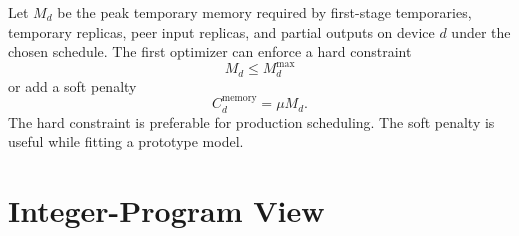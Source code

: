 \documentclass[11pt]{article}
\begin{document}
Let $M_d$ be the peak temporary memory required by first-stage temporaries,
temporary replicas, peer input replicas, and partial outputs on device $d$
under the chosen schedule.  The first optimizer can enforce a hard constraint
\begin{equation}
  M_d \le M^{\max}_d
\end{equation}
or add a soft penalty
\begin{equation}
  C^{\mathrm{memory}}_d = \mu M_d.
\end{equation}
The hard constraint is preferable for production scheduling.  The soft penalty
is useful while fitting a prototype model.

\section{Integer-Program View}
\end{document}
